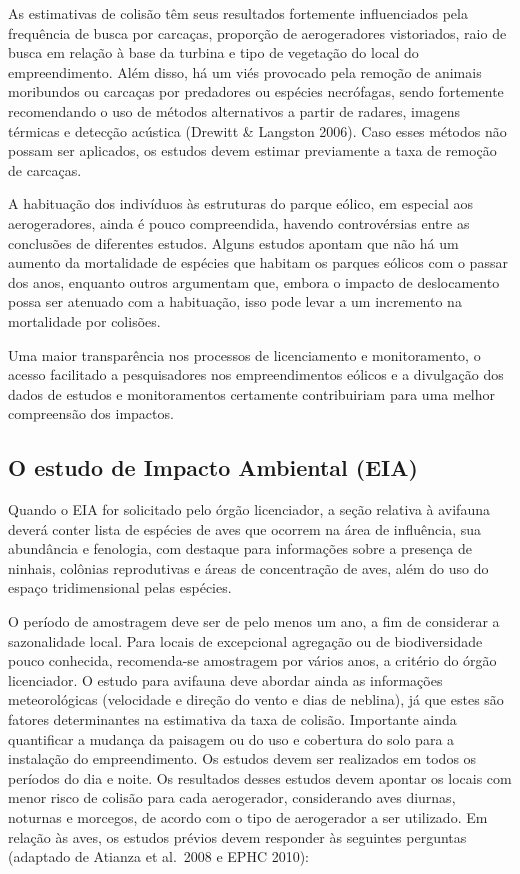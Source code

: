 \documentclass[
  oneside]{scrbook}
\begin{document}
As estimativas de colisão têm seus resultados fortemente influenciados pela frequência de busca por carcaças, proporção de aerogeradores vistoriados, raio de busca em relação à base da turbina e tipo de vegetação do local do empreendimento. Além disso, há um viés provocado pela remoção de animais moribundos ou carcaças por predadores ou espécies necrófagas, sendo fortemente recomendando o uso de métodos alternativos a partir de radares, imagens térmicas e detecção acústica (Drewitt \& Langston 2006). Caso esses métodos não possam ser aplicados, os estudos devem estimar previamente a taxa de remoção de carcaças.

A habituação dos indivíduos às estruturas do parque eólico, em especial aos aerogeradores, ainda é pouco compreendida, havendo controvérsias entre as conclusões de diferentes estudos. Alguns estudos apontam que não há um aumento da mortalidade de espécies que habitam os parques eólicos com o passar dos anos, enquanto outros argumentam que, embora o impacto de deslocamento possa ser atenuado com a habituação, isso pode levar a um incremento na mortalidade por colisões.

Uma maior transparência nos processos de licenciamento e monitoramento, o acesso facilitado a pesquisadores nos empreendimentos eólicos e a divulgação dos dados de estudos e monitoramentos certamente contribuiriam para uma melhor compreensão dos impactos.

\hypertarget{EIA}{%
\subsection{O estudo de Impacto Ambiental (EIA)}\label{EIA}}

Quando o EIA for solicitado pelo órgão licenciador, a seção relativa à avifauna deverá conter lista de espécies de aves que ocorrem na área de influência, sua abundância e fenologia, com destaque para informações sobre a presença de ninhais, colônias reprodutivas e áreas de concentração de aves, além do uso do espaço tridimensional pelas espécies.

O período de amostragem deve ser de pelo menos um ano, a fim de considerar a sazonalidade local. Para locais de excepcional agregação ou de biodiversidade pouco conhecida, recomenda-se amostragem por vários anos, a critério do órgão licenciador. O estudo para avifauna deve abordar ainda as informações meteorológicas (velocidade e direção do vento e dias de neblina), já que estes são fatores determinantes na estimativa da taxa de colisão. Importante ainda quantificar a mudança da paisagem ou do uso e cobertura do solo para a instalação do empreendimento. Os estudos devem ser realizados em todos os períodos do dia e noite. Os resultados desses estudos devem apontar os locais com menor risco de colisão para cada aerogerador, considerando aves diurnas, noturnas e morcegos, de acordo com o tipo de aerogerador a ser utilizado. Em relação às aves, os estudos prévios devem responder às seguintes perguntas (adaptado de Atianza et al.~2008 e EPHC 2010):
\end{document}
